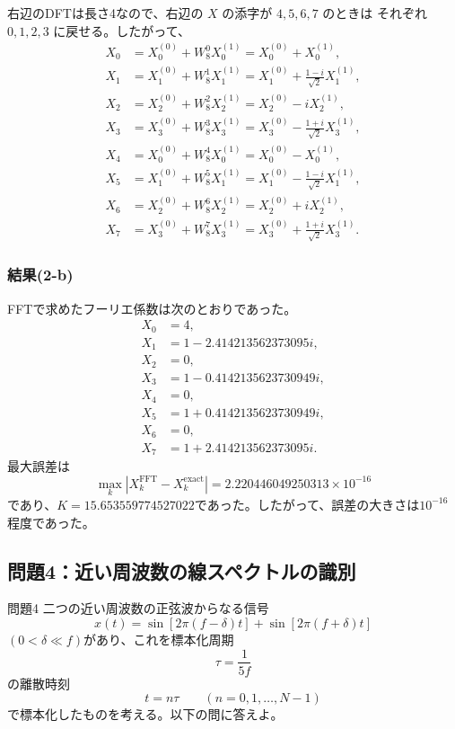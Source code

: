 \documentclass[a4j]{jarticle}
\begin{document}
右辺のDFTは長さ4なので、右辺の $X$ の添字が $4,5,6,7$ のときは
それぞれ $0,1,2,3$ に戻せる。したがって、
\[
\begin{aligned}
X_0 &= X_0^{(0)} + W_8^0 X_0^{(1)}
     = X_0^{(0)} + X_0^{(1)},\\
X_1 &= X_1^{(0)} + W_8^1 X_1^{(1)}
     = X_1^{(0)} + \frac{1-i}{\sqrt{2}}X_1^{(1)},\\
X_2 &= X_2^{(0)} + W_8^2 X_2^{(1)}
     = X_2^{(0)} - iX_2^{(1)},\\
X_3 &= X_3^{(0)} + W_8^3 X_3^{(1)}
     = X_3^{(0)} - \frac{1+i}{\sqrt{2}}X_3^{(1)},\\[4pt]
X_4 &= X_0^{(0)} + W_8^4 X_0^{(1)}
     = X_0^{(0)} - X_0^{(1)},\\
X_5 &= X_1^{(0)} + W_8^5 X_1^{(1)}
     = X_1^{(0)} - \frac{1-i}{\sqrt{2}}X_1^{(1)},\\
X_6 &= X_2^{(0)} + W_8^6 X_2^{(1)}
     = X_2^{(0)} + iX_2^{(1)},\\
X_7 &= X_3^{(0)} + W_8^7 X_3^{(1)}
     = X_3^{(0)} + \frac{1+i}{\sqrt{2}}X_3^{(1)}.
\end{aligned}
\]

\subsubsection{結果(2-b)}
FFTで求めたフーリエ係数は次のとおりであった。
\[
  \begin{aligned}
    X_0&=4,\\
    X_1&=1-2.414213562373095i,\\
    X_2&=0,\\
    X_3&=1-0.4142135623730949i,\\
    X_4&=0,\\
    X_5&=1+0.4142135623730949i,\\
    X_6&=0,\\
    X_7&=1+2.414213562373095i.
  \end{aligned}
\]
最大誤差は
\[
  \max_k\left|X_k^{\mathrm{FFT}}-X_k^{\mathrm{exact}}\right|
  =2.220446049250313\times10^{-16}
\]
であり、$K=15.653559774527022$であった。したがって、誤差の大きさは$10^{-16}$程度であった。

\subsection{問題4：近い周波数の線スペクトルの識別}
\begin{itembox}[l]{問題4}
二つの近い周波数の正弦波からなる信号
\begin{equation}
  x(t)=\sin\left[2\pi(f-\delta)t\right]
      +\sin\left[2\pi(f+\delta)t\right]
  \tag{P4}
  \label{eq:close-frequency-signal}
\end{equation}
$(0<\delta\ll f)$があり、これを標本化周期
\[
  \tau=\frac{1}{5f}
\]
の離散時刻
\[
  t=n\tau\qquad(n=0,1,\ldots,N-1)
\]
で標本化したものを考える。以下の問に答えよ。
\end{itembox}
\end{document}
